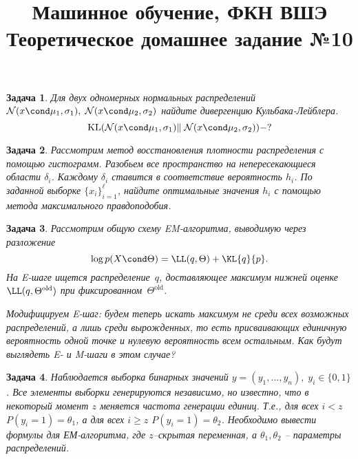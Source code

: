 \documentclass[12pt,fleqn]{article}
\title{Машинное обучение, ФКН ВШЭ\\Теоретическое домашнее задание №10}
\author{}
\date{}
\newtheorem{esProblem}{Задача}
\begin{document}
\maketitle

\begin{esProblem}
	Для двух одномерных нормальных распределений $\mathcal{N}(x\cond \mu_1, \sigma_1), \; \mathcal{N}(x\cond \mu_2, \sigma_2)$ найдите дивергенцию Кульбака-Лейблера.
	\begin{equation*}
		\text{KL}(\mathcal{N}(x\cond \mu_1, \sigma_1)\Vert \; \mathcal{N}(x\cond \mu_2, \sigma_2)) - ?
	\end{equation*}
\end{esProblem}

\begin{esProblem}
	Рассмотрим метод восстановления плотности распределения с помощью гистограмм. Разобьем все пространство на непересекающиеся области $\delta_i$. Каждому $\delta_i$ ставится в соответствие вероятность $h_i$. По заданной выборке $\{x_i\}_{i=1}^\ell$, найдите оптимальные значения $h_i$ с помощью метода максимального правдоподобия.
\end{esProblem}

\begin{esProblem}
    Рассмотрим общую схему EM-алгоритма,
    выводимую через разложение
    \[
        \log p(X \cond \Theta)
        =
        \LL(q, \Theta)
        +
        \KL{q}{p}.
    \]
    На E-шаге ищется распределение~$q$,
    доставляющее максимум нижней оценке~$\LL(q, \Theta^\text{old})$
    при фиксированном~$\Theta^\text{old}$.

    Модифицируем E-шаг: будем теперь искать максимум не среди всех
    возможных распределений, а лишь среди вырожденных,
    то есть присваивающих единичную вероятность одной точке
    и нулевую вероятность всем остальным.
    Как будут выглядеть E- и M-шаги в этом случае?
\end{esProblem}

\begin{esProblem}
	Наблюдается выборка бинарных значений $y = (y_1,\ldots, y_n), \; y_i\in\{0,1\}$. Все элементы выборки генерируются независимо, но известно, что в некоторый момент $z$ меняется частота генерации единиц. Т.е., для всех $i < z$ $P(y_i=1) = \theta_1$, а для всех $i \geq z$ $P(y_i=1) = \theta_2$. Необходимо вывести формулы для ЕМ-алгоритма, где $z$–скрытая переменная, а $\theta_1, \theta_2$ – параметры распределений.
\end{esProblem}
\end{document}
